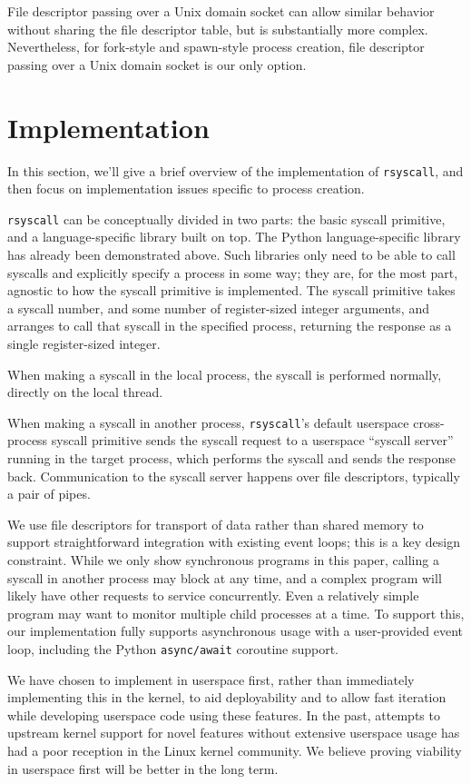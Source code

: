 \documentclass[letterpaper,twocolumn,10pt]{article}
\begin{document}
File descriptor passing over a Unix domain socket
can allow similar behavior without sharing the file descriptor table,
but is substantially more complex.\cite{scm_rights}
Nevertheless, for fork-style and spawn-style process creation,
file descriptor passing over a Unix domain socket
is our only option.
\section{Implementation}\label{implementation}
In this section, we'll give a brief overview of the implementation of \texttt{rsyscall},
and then focus on implementation issues specific to process creation.

\texttt{rsyscall} can be conceptually divided in two parts:
the basic syscall primitive,
and a language-specific library built on top.
The Python language-specific library has already been demonstrated above.
Such libraries only need to be able to call syscalls and explicitly specify a process in some way;
they are, for the most part, agnostic to how the syscall primitive is implemented.
The syscall primitive takes a syscall number, and some number of register-sized integer arguments,
and arranges to call that syscall in the specified process,
returning the response as a single register-sized integer.

When making a syscall in the local process, the syscall is performed normally,
directly on the local thread.

When making a syscall in another process,
\texttt{rsyscall}'s default userspace cross-process syscall primitive sends the syscall request
to a userspace ``syscall server'' running in the target process,
which performs the syscall and sends the response back.
Communication to the syscall server happens over file descriptors,
typically a pair of pipes.

We use file descriptors for transport of data rather than shared memory
to support straightforward integration with existing event loops;
this is a key design constraint.
While we only show synchronous programs in this paper,
calling a syscall in another process may block at any time,
and a complex program will likely have other requests to service concurrently.
Even a relatively simple program may want to monitor multiple child processes at a time.
To support this,
our implementation fully supports asynchronous usage with a user-provided event loop,
including the Python \texttt{async/await} coroutine support.\cite{python_coroutines}

We have chosen to implement in userspace first,
rather than immediately implementing this in the kernel,
to aid deployability
and to allow fast iteration while developing userspace code using these features.
In the past, attempts to upstream kernel support for novel features without extensive userspace usage
has had a poor reception in the Linux kernel community.\cite{lwn_checkpoint}\cite{first_class_address_space}
We believe proving viability in userspace first will be better in the long term.
\end{document}
